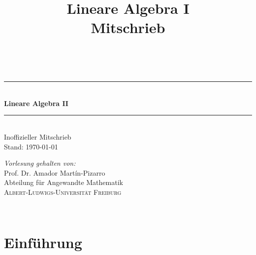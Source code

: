 \documentclass{report}
\title{Lineare Algebra I\\Mitschrieb}
\theoremstyle{customrem}
\theoremstyle{customdef}
\theoremstyle{customenv}
\begin{document}
  \begin{titlepage}
    \newcommand{\HRule}{\rule{\linewidth}{0.5mm}}
    \centering
    \vspace{6cm}
    \textsc{\large \thinspace}\\[0.5cm]
    \vspace{4cm}
    \HRule \\[0.8cm]
    { \Huge  \textbf{Lineare Algebra \(\mathbf{II}\)}}\\[0.4cm]
    \HRule \\[.5cm]
    {\Large Inoffizieller Mitschrieb}\\[1.0cm]
    Stand: \today
    \\[11.5cm]
    \begin{minipage}{0.65\textwidth}
      \begin{center} \large
        \textsl{Vorlesung gehalten von:}\\[1cm]
        Prof. Dr. Amador Martín-Pizarro\\
        Abteilung für Angewandte Mathematik\\
        \textsc{\large Albert-Ludwigs-Universität Freiburg}
      \end{center}
    \end{minipage}\\[2.5cm]
    \thispagestyle{empty}
  \end{titlepage}


\section*{Einführung}


\newpage
\renewcommand{\listtheoremname}{Satz- und Definitionsverzeichnis}
\listoftheorems[ignoreall, show={definition}, show={satz}, show={lemma}, show={definitionn}, show={korrolar}, show={altdefinition}]
\newpage
\printindex
\end{document}
